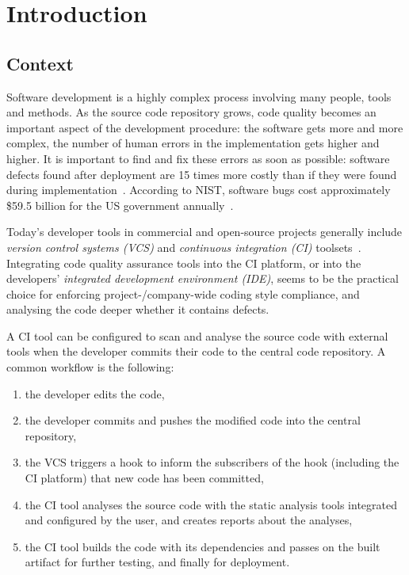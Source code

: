 \chapter{Introduction}
\label{chapter:introduction}


\section{Context}

Software development is a highly complex process involving many people, tools and methods. As the source code repository grows, code quality becomes an important aspect of the development procedure: the software gets more and more complex, the number of human errors in the implementation gets higher and higher. It is important to find and fix these errors as soon as possible: software defects found after deployment are 15 times more costly than if they were found during implementation~\cite{dawson2010integrating}. According to NIST, software bugs cost approximately \$59.5 billion for the US government annually~\cite{tassey2002economic}.

Today's developer tools in commercial and open-source projects generally include \emph{version control systems (VCS)} and \emph{continuous integration (CI)} toolsets~\cite{hilton2016usage, fowlerCI}. Integrating code quality assurance tools into the CI platform, or into the developers' \emph{integrated development environment (IDE)}, seems to be the practical choice for enforcing project-/company-wide coding style compliance, and analysing the code deeper whether it contains defects.

A CI tool can be configured to scan and analyse the source code with external tools when the developer commits their code to the central code repository. A common workflow is the following:

\begin{enumerate}
\item the developer edits the code,
\item the developer commits and pushes the modified code into the central repository,
\item the VCS triggers a hook to inform the subscribers of the hook (including the CI platform) that new code has been committed,
\item the CI tool analyses the source code with the static analysis tools integrated and configured by the user, and creates reports about the analyses,
\item the CI tool builds the code with its dependencies and passes on the built artifact for further testing, and finally for deployment.
\end{enumerate}

